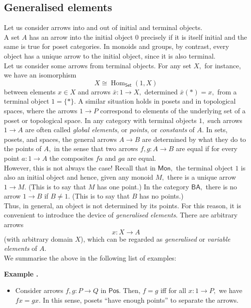 \documentclass[11pt,leqno,landscape,semhelv]{seminar}
\numberwithin{equation}{section}
\theoremstyle{definition}
\numberwithin{thm}{section}
\numberwithin{equation}{section}
\newcommand{\example}[1]{\refstepcounter{thm}\par\medskip
   {\textbf{Example \thethm.} #1} \rmfamily}
\newcommand{\Hom}{\operatorname{Hom}}
\begin{document}
\begin{enumerate}
\subsection{Generalised elements}
Let us consider arrows into and out of initial and terminal objects.\\
A set $A$ has an arrow into the initial object $0$ precisely if it is itself initial and the same is true for poset categories. In monoids and groups, by contrast, every object has a unique arrow to the initial object, since it is also terminal.\\
Let us consider some arrows from terminal objects. For any set $X,$ for instance, we have an isomorphism
\begin{equation*} 
	X \cong \Hom_{\mathsf{Set}}(1, X)
\end{equation*}
between elements $x \in X$ and arrows $\bar{x}:1\to X,$ determined $\bar{x}(*) = x,$ from a terminal object $1 = \{*\}.$ A similar situation holds in posets and in topological spaces, where the arrows $1\to P$ correspond to elements of the underlying set of a poset or topological space. In any category with terminal objects $1,$ such arrows $1 \to A$ are often called \emph{global elements}, or \emph{points}, or \emph{constants} of $A.$ In sets, posets, and spaces, the general arrows $A \to B$ are determined by what they do to the points of $A,$ in the sense that two arrows $f, g: A \to B$ are equal if for every point $a:1 \to A$ the composites $fa$ and $ga$ are equal.\\
However, this is not always the case! Recall that in $\mathsf{Mon},$ the terminal object $1$ is also an initial object and hence, given any monoid $M,$ there is a unique arrow $1\to M.$ (This is to say that $M$ has one point.) In the category $\mathsf{BA},$ there is no arrow $1 \to B$ if $B \neq 1.$ (This is to say that $B$ has no points.)\\
Thus, in general, an object is not determined by its points. For this reason, it is convenient to introduce the device of \emph{generalised elements}. There are arbitrary arrows
\begin{equation*} 
	x : X \to A
\end{equation*}
(with arbitrary domain $X$), which can be regarded as \emph{generalised} or \emph{variable elements} of $A.$\\
We summarise the above in the following list of examples:\\
\example{}
\begin{itemize}
	\item Consider arrows $f, g: P\to Q$ in $\mathsf{Pos}.$ Then, $f = g$ iff for all $x:1 \to P,$ we have $fx = gx.$ In this sense, posets ``have enough points'' to separate the arrows.

\end{itemize}
\end{enumerate}
\end{document}
